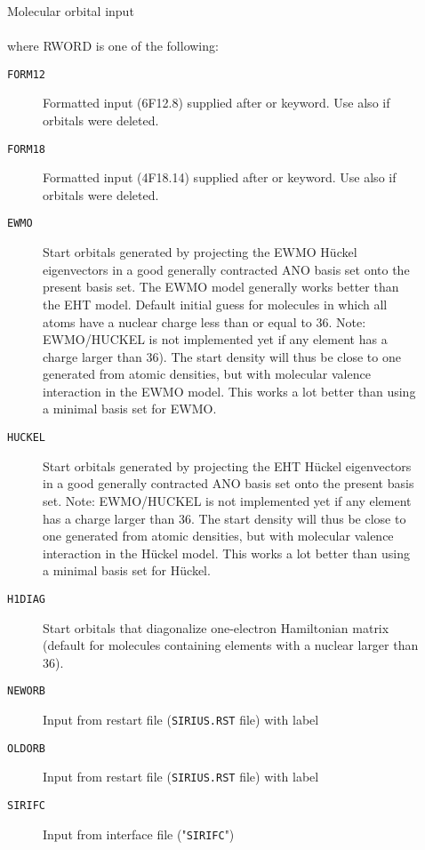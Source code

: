 \begin{description}
\item[]
   Molecular orbital input\\
    \\
   where RWORD is one of the following:
   \begin{description}
   \item[{\tt FORM12\ }] Formatted input (6F12.8)  supplied after
         or  keyword. Use also 
        if orbitals were deleted.
   \item[{\tt FORM18\ }] Formatted input (4F18.14) supplied after
         or  keyword. Use also 
        if orbitals were deleted.
   \item[{\tt EWMO\ }] Start orbitals generated by projecting the EWMO
        H{\"u}ckel eigenvectors in a good generally contracted ANO basis set
        onto the present basis set.
        The EWMO model generally works better than the EHT model.
        Default initial guess for molecules in which all atoms have a nuclear charge
        less than or equal to 36.
        Note: EWMO/HUCKEL is not implemented yet if any element has a
        charge larger than 36).
        The start density will thus be close to one generated from atomic densities,
        but with molecular valence interaction in the EWMO model.
        This works a lot better than using a minimal basis set for EWMO.
   \item[{\tt HUCKEL\ }] Start orbitals generated by projecting the EHT
        H{\"u}ckel eigenvectors in a good generally contracted ANO basis set
        onto the present basis set.
        Note: EWMO/HUCKEL is not implemented yet if any element has a
        charge larger than 36.
        The start density will thus be close to one generated from atomic densities,
        but with molecular valence interaction in the H{\"u}ckel model.
        This works a lot better than using a minimal basis set for H{\"u}ckel.
   \item[{\tt H1DIAG\ }] Start orbitals that diagonalize
        one-electron Hamiltonian matrix (default
        for molecules containing elements with a nuclear larger than 36).
   \item[{\tt NEWORB\ }] Input from {\sir} restart file
                            (\verb|SIRIUS.RST| file) with label 
   \item[{\tt OLDORB\ }] Input from {\sir} restart file
                            (\verb|SIRIUS.RST| file) with label 
   \item[{\tt SIRIFC\ }] Input from {\sir} interface file ("\verb|SIRIFC|")
\end{description}


\end{description}
